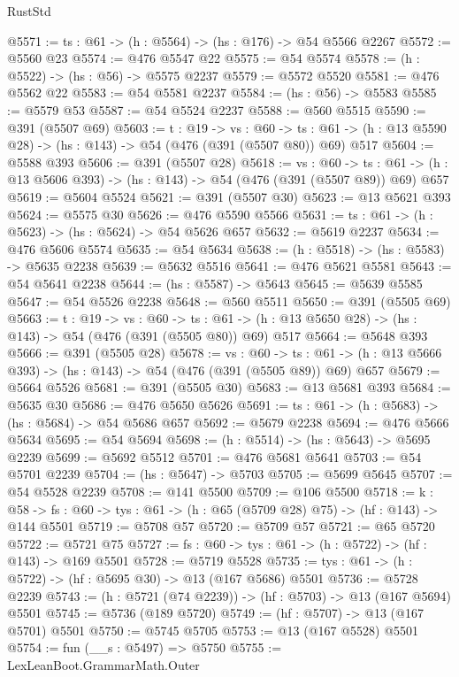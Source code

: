 \begin{lexlean}{RustStd}
\begin{coremodule}
@5571 := {ts : @61} -> (h : @5564) -> (hs : @176) -> @54 @5566 @2267
@5572 := @5560 @23
@5574 := @476 @5547 @22
@5575 := @54 @5574
@5578 := (h : @5522) -> (hs : @56) -> @5575 @2237
@5579 := @5572 @5520
@5581 := @476 @5562 @22
@5583 := @54 @5581 @2237
@5584 := (hs : @56) -> @5583
@5585 := @5579 @53
@5587 := @54 @5524 @2237
@5588 := @560 @5515
@5590 := @391 (@5507 @69)
@5603 := {t : @19} ->
  {vs : @60} ->
  {ts : @61} -> (h : @13 @5590 @28) -> (hs : @143) -> @54 (@476 (@391 (@5507 @80)) @69) @517
@5604 := @5588 @393
@5606 := @391 (@5507 @28)
@5618 := {vs : @60} ->
  {ts : @61} -> (h : @13 @5606 @393) -> (hs : @143) -> @54 (@476 (@391 (@5507 @89)) @69) @657
@5619 := @5604 @5524
@5621 := @391 (@5507 @30)
@5623 := @13 @5621 @393
@5624 := @5575 @30
@5626 := @476 @5590 @5566
@5631 := {ts : @61} -> (h : @5623) -> (hs : @5624) -> @54 @5626 @657
@5632 := @5619 @2237
@5634 := @476 @5606 @5574
@5635 := @54 @5634
@5638 := (h : @5518) -> (hs : @5583) -> @5635 @2238
@5639 := @5632 @5516
@5641 := @476 @5621 @5581
@5643 := @54 @5641 @2238
@5644 := (hs : @5587) -> @5643
@5645 := @5639 @5585
@5647 := @54 @5526 @2238
@5648 := @560 @5511
@5650 := @391 (@5505 @69)
@5663 := {t : @19} ->
  {vs : @60} ->
  {ts : @61} -> (h : @13 @5650 @28) -> (hs : @143) -> @54 (@476 (@391 (@5505 @80)) @69) @517
@5664 := @5648 @393
@5666 := @391 (@5505 @28)
@5678 := {vs : @60} ->
  {ts : @61} -> (h : @13 @5666 @393) -> (hs : @143) -> @54 (@476 (@391 (@5505 @89)) @69) @657
@5679 := @5664 @5526
@5681 := @391 (@5505 @30)
@5683 := @13 @5681 @393
@5684 := @5635 @30
@5686 := @476 @5650 @5626
@5691 := {ts : @61} -> (h : @5683) -> (hs : @5684) -> @54 @5686 @657
@5692 := @5679 @2238
@5694 := @476 @5666 @5634
@5695 := @54 @5694
@5698 := (h : @5514) -> (hs : @5643) -> @5695 @2239
@5699 := @5692 @5512
@5701 := @476 @5681 @5641
@5703 := @54 @5701 @2239
@5704 := (hs : @5647) -> @5703
@5705 := @5699 @5645
@5707 := @54 @5528 @2239
@5708 := @141 @5500
@5709 := @106 @5500
@5718 := {k : @58} ->
  {fs : @60} -> {tys : @61} -> (h : @65 (@5709 @28) @75) -> (hf : @143) -> @144 @5501
@5719 := @5708 @57
@5720 := @5709 @57
@5721 := @65 @5720
@5722 := @5721 @75
@5727 := {fs : @60} -> {tys : @61} -> (h : @5722) -> (hf : @143) -> @169 @5501
@5728 := @5719 @5528
@5735 := {tys : @61} -> (h : @5722) -> (hf : @5695 @30) -> @13 (@167 @5686) @5501
@5736 := @5728 @2239
@5743 := (h : @5721 (@74 @2239)) -> (hf : @5703) -> @13 (@167 @5694) @5501
@5745 := @5736 (@189 @5720)
@5749 := (hf : @5707) -> @13 (@167 @5701) @5501
@5750 := @5745 @5705
@5753 := @13 (@167 @5528) @5501
@5754 := fun (__s : @5497) => @5750
@5755 := LexLeanBoot.GrammarMath.Outer

\end{coremodule}
\end{lexlean}
